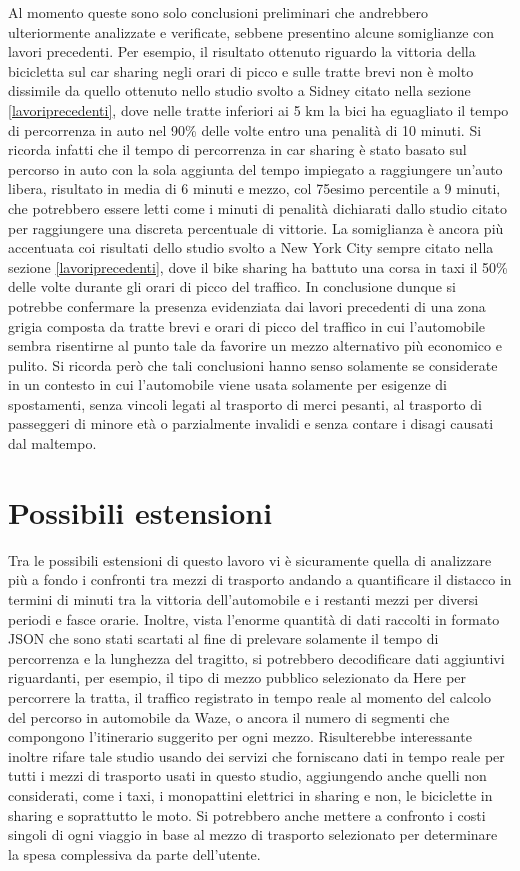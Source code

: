 Al momento queste sono solo conclusioni preliminari che andrebbero ulteriormente analizzate e verificate, sebbene presentino alcune somiglianze con lavori precedenti. Per esempio, il risultato ottenuto riguardo la vittoria della bicicletta sul car sharing negli orari di picco e sulle tratte brevi non è molto dissimile da quello ottenuto nello studio svolto a Sidney citato nella sezione \ref{lavoriprecedenti}, dove nelle tratte inferiori ai 5 km la bici ha eguagliato il tempo di percorrenza in auto nel 90\% delle volte entro una penalità di 10 minuti. Si ricorda infatti che il tempo di percorrenza in car sharing è stato basato sul percorso in auto con la sola aggiunta del tempo impiegato a raggiungere un'auto libera, risultato in media di 6 minuti e mezzo, col 75esimo percentile a 9 minuti, che potrebbero essere letti come i minuti di penalità dichiarati dallo studio citato per raggiungere una discreta percentuale di vittorie. La somiglianza è ancora più accentuata coi risultati dello studio svolto a New York City sempre citato nella sezione \ref{lavoriprecedenti}, dove il bike sharing ha battuto una corsa in taxi il 50\% delle volte durante gli orari di picco del traffico. In conclusione dunque si potrebbe confermare la presenza evidenziata dai lavori precedenti di una zona grigia composta da tratte brevi e orari di picco del traffico in cui l'automobile sembra risentirne al punto tale da favorire un mezzo alternativo più economico e pulito. Si ricorda però che tali conclusioni hanno senso solamente se considerate in un contesto in cui l'automobile viene usata solamente per esigenze di spostamenti, senza vincoli legati al trasporto di merci pesanti, al trasporto di passeggeri di minore età o parzialmente invalidi e senza contare i disagi causati dal maltempo.

\section{Possibili estensioni}

Tra le possibili estensioni di questo lavoro vi è sicuramente quella di analizzare più a fondo i confronti tra mezzi di trasporto andando a quantificare il distacco in termini di minuti tra la vittoria dell'automobile e i restanti mezzi per diversi periodi e fasce orarie. Inoltre, vista l'enorme quantità di dati raccolti in formato JSON che sono stati scartati al fine di prelevare solamente il tempo di percorrenza e la lunghezza del tragitto, si potrebbero decodificare dati aggiuntivi riguardanti, per esempio, il tipo di mezzo pubblico selezionato da Here per percorrere la tratta, il traffico registrato in tempo reale al momento del calcolo del percorso in automobile da Waze, o ancora il numero di segmenti che compongono l'itinerario suggerito per ogni mezzo. Risulterebbe interessante inoltre rifare tale studio usando dei servizi che forniscano dati in tempo reale per tutti i mezzi di trasporto usati in questo studio, aggiungendo anche quelli non considerati, come i taxi, i monopattini elettrici in sharing e non, le biciclette in sharing e soprattutto le moto. Si potrebbero anche mettere a confronto i costi singoli di ogni viaggio in base al mezzo di trasporto selezionato per determinare la spesa complessiva da parte dell'utente.

